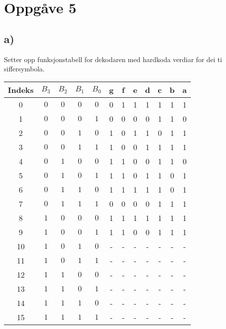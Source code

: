 \documentclass[12pt,a4paper]{article}
\begin{document}
  \section{Oppgåve 5}
    \subsection{a)}
      Setter opp funksjonstabell for dekodaren med hardkoda verdiar for dei 
      ti siffersymbola.
      \begin{center}
        \begin{tabular}{ |c|c|c|c|c| c|c|c|c|c|c|c| }
          \hline
          Indeks & $B_3$ & $B_2$ & $B_1$ & $B_0$ & g & f & e & d & c & b & a \\
          \hline
          0 & $0$ & $0$ & $0$ & $0$ &    0 & 1 & 1 & 1 & 1 & 1 & 1 \\
          \hline
          1 & $0$ & $0$ & $0$ & $1$ &    0 & 0 & 0 & 0 & 1 & 1 & 0 \\
          \hline
          2 & $0$ & $0$ & $1$ & $0$ &    1 & 0 & 1 & 1 & 0 & 1 & 1 \\
          \hline
          3 & $0$ & $0$ & $1$ & $1$ &    1 & 0 & 0 & 1 & 1 & 1 & 1 \\
          \hline
          4 & $0$ & $1$ & $0$ & $0$ &    1 & 1 & 0 & 0 & 1 & 1 & 0 \\
          \hline
          5 & $0$ & $1$ & $0$ & $1$ &    1 & 1 & 0 & 1 & 1 & 0 & 1 \\
          \hline
          6 & $0$ & $1$ & $1$ & $0$ &    1 & 1 & 1 & 1 & 1 & 0 & 1 \\
          \hline
          7 & $0$ & $1$ & $1$ & $1$ &    0 & 0 & 0 & 0 & 1 & 1 & 1 \\
          \hline
          8 & $1$ & $0$ & $0$ & $0$ &    1 & 1 & 1 & 1 & 1 & 1 & 1 \\
          \hline
          9 & $1$ & $0$ & $0$ & $1$ &    1 & 1 & 0 & 0 & 1 & 1 & 1 \\
          \hline
          10 & $1$ & $0$ & $1$ & $0$ & - & - & - & - & - & - & - \\
          \hline
          11 & $1$ & $0$ & $1$ & $1$ & - & - & - & - & - & - & - \\
          \hline
          12 & $1$ & $1$ & $0$ & $0$ & - & - & - & - & - & - & - \\
          \hline
          13 & $1$ & $1$ & $0$ & $1$ & - & - & - & - & - & - & - \\
          \hline
          14 & $1$ & $1$ & $1$ & $0$ & - & - & - & - & - & - & - \\
          \hline
          15 & $1$ & $1$ & $1$ & $1$ & - & - & - & - & - & - & - \\
          \hline
        \end{tabular}
      \end{center}
\end{document}
